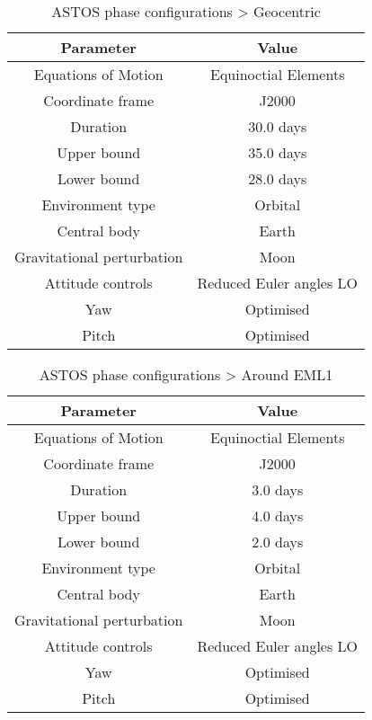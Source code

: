 \begin{table}
\caption{ASTOS phase configurations > Geocentric}
\label{tab:ASTOS-phase-configurations>geocentric}
\begin{center}
\begin{tabular}{|cc|}
\hline
Parameter & Value\\
\hline
\hline
Equations of Motion & Equinoctial Elements\\
Coordinate frame & J2000\\
Duration & 30.0 days\\
Upper bound & 35.0 days\\
Lower bound & 28.0 days\\
Environment type & Orbital\\
Central body & Earth\\
Gravitational perturbation & Moon\\
Attitude controls & Reduced Euler angles LO\\
Yaw & Optimised\\
Pitch & Optimised\\
\hline
\end{tabular}
\end{center}
\end{table}

\begin{table}
\caption{ASTOS phase configurations > Around EML1}
\label{tab:ASTOS-phase-configurations>around-l1}
\begin{center}
\begin{tabular}{|cc|}
\hline
Parameter & Value\\
\hline
\hline
Equations of Motion & Equinoctial Elements\\
Coordinate frame & J2000\\
Duration & 3.0 days\\
Upper bound & 4.0 days\\
Lower bound & 2.0 days\\
Environment type & Orbital\\
\hline
Central body & Earth\\
Gravitational perturbation & Moon\\
Attitude controls & Reduced Euler angles LO\\
Yaw & Optimised\\
Pitch & Optimised\\
\hline
\end{tabular}
\end{center}
\end{table}

